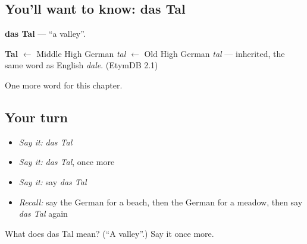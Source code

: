 \subsection*{You'll want to know: das Tal}
\textbf{das Tal} — \textquotedblleft{}a valley\textquotedblright{}.

\begin{cousinweb}
\textbf{Tal} $\leftarrow$ Middle High German \emph{tal} $\leftarrow$ Old High German \emph{tal} — inherited, the same word as English \emph{dale}. (EtymDB 2.1)
\end{cousinweb}

\begin{grammarlens}[title={What you've built}]
One more word for this chapter.
\end{grammarlens}

\subsection*{Your turn}
\begin{itemize}
\raggedright
  \item \emph{Say it:} \emph{das Tal}
  \item \emph{Say it:} \emph{das Tal}, once more
  \item \emph{Say it:} say \emph{das Tal}
  \item \emph{Recall:} say the German for a beach, then the German for a meadow, then say \emph{das Tal} again
\end{itemize}

\begin{tcolorbox}[breakable,colback=teal!4,colframe=teal!35!black,title={Before you move on}]
What does das Tal mean? (\textquotedblleft{}A valley\textquotedblright{}.) Say it once more.
\end{tcolorbox}
